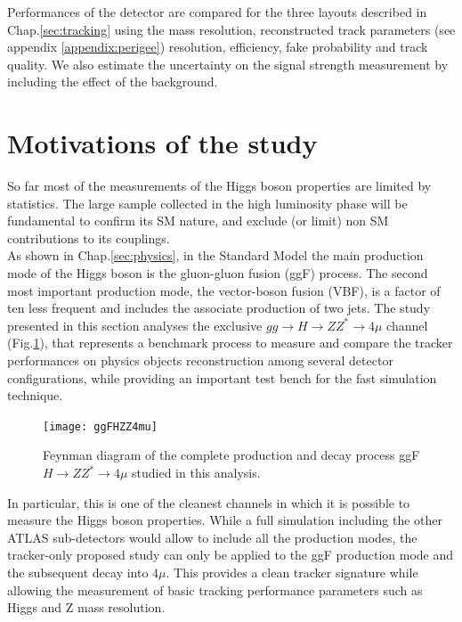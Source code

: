 \documentclass[a4paper,twoside,12pt]{book}
\begin{document}
Performances of the detector are compared for the three layouts described in Chap.\ref{sec:tracking} 
using the mass resolution, reconstructed track parameters (see appendix \ref{appendix:perigee}) resolution, efficiency, fake probability
and track quality. We also estimate the uncertainty on the signal strength measurement by including the effect of the background.\\

\section{Motivations of the study}
So far most of the measurements of the Higgs boson properties are limited by statistics. The large sample collected in the high luminosity phase will be
fundamental to confirm its SM nature, and exclude (or limit) non SM contributions to its couplings. \\

As shown in Chap.\ref{sec:physics}, in the Standard Model the main 
production mode of the Higgs boson is the gluon-gluon fusion (ggF) process. The second most 
important production mode, the vector-boson fusion (VBF), is a factor of ten less frequent and includes the associate
production of two jets. The study presented in this section analyses the exclusive
$gg \rightarrow H \rightarrow ZZ^* \rightarrow 4\mu$ channel (Fig.\ref{fig:ggFHZZ4mu}), that represents a benchmark process to measure and compare the tracker performances on physics objects reconstruction among several detector
configurations, while providing an important test bench for the fast simulation technique.\\

\begin{figure} [h]
	\centering
	\texttt{[image: ggFHZZ4mu]}
	\caption{Feynman diagram of the complete production and decay process 
	ggF $H \rightarrow ZZ^* \rightarrow 4\mu$ studied in 
	this analysis.}
	\label{fig:ggFHZZ4mu}
\end{figure}

In particular, this is one of the cleanest channels in which it is possible to measure the Higgs boson properties. While a full 
simulation including the other ATLAS sub-detectors would allow to include all the
production modes, the tracker-only proposed study can only
be applied to the ggF production mode and the subsequent decay into $4\mu$. This provides a clean tracker signature while
allowing the measurement of basic tracking performance parameters such as Higgs and Z mass resolution.
\end{document}
